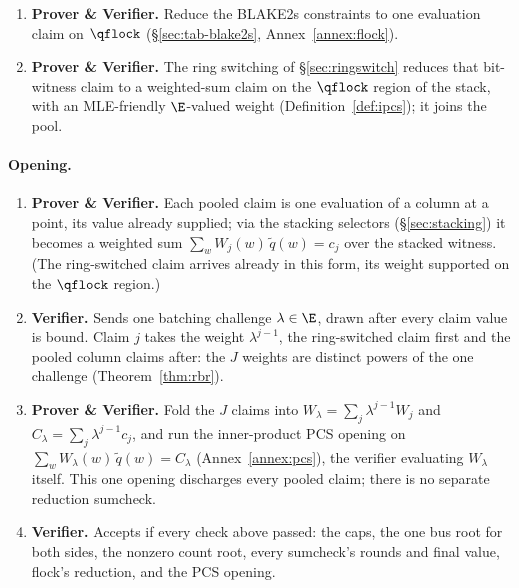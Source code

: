 \begin{enumerate}
\item \textbf{Prover \& Verifier.} Reduce the BLAKE2s constraints to one evaluation claim on $\qflock$ (\S\ref{sec:tab-blake2s}, Annex~\ref{annex:flock}).
\item \textbf{Prover \& Verifier.} The ring switching of \S\ref{sec:ringswitch} reduces that bit-witness claim to a weighted-sum claim on the $\qflock$ region of the stack, with an MLE-friendly $\E$-valued weight (Definition~\ref{def:ipcs}); it joins the pool.
\end{enumerate}

\paragraph{Opening.}

\begin{enumerate}
\item \textbf{Prover \& Verifier.} Each pooled claim is one evaluation of a column at a point, its value already supplied; via the stacking selectors (\S\ref{sec:stacking}) it becomes a weighted sum $\sum_w W_j(w)\,\widetilde q(w)=c_j$ over the stacked witness. (The ring-switched claim arrives already in this form, its weight supported on the $\qflock$ region.)
\item \textbf{Verifier.} Sends one batching challenge $\lambda\in\E$, drawn after every claim value is bound. Claim $j$ takes the weight $\lambda^{j-1}$, the ring-switched claim first and the pooled column claims after: the $J$ weights are distinct powers of the one challenge (Theorem~\ref{thm:rbr}).
\item \textbf{Prover \& Verifier.} Fold the $J$ claims into $W_\lambda=\sum_j\lambda^{j-1} W_j$ and $C_\lambda=\sum_j\lambda^{j-1} c_j$, and run the inner-product PCS opening on $\sum_w W_\lambda(w)\,\widetilde q(w)=C_\lambda$ (Annex~\ref{annex:pcs}), the verifier evaluating $W_\lambda$ itself. This one opening discharges every pooled claim; there is no separate reduction sumcheck.
\item \textbf{Verifier.} Accepts if every check above passed: the caps, the one bus root for both sides, the nonzero count root, every sumcheck's rounds and final value, flock's reduction, and the PCS opening.
\end{enumerate}
